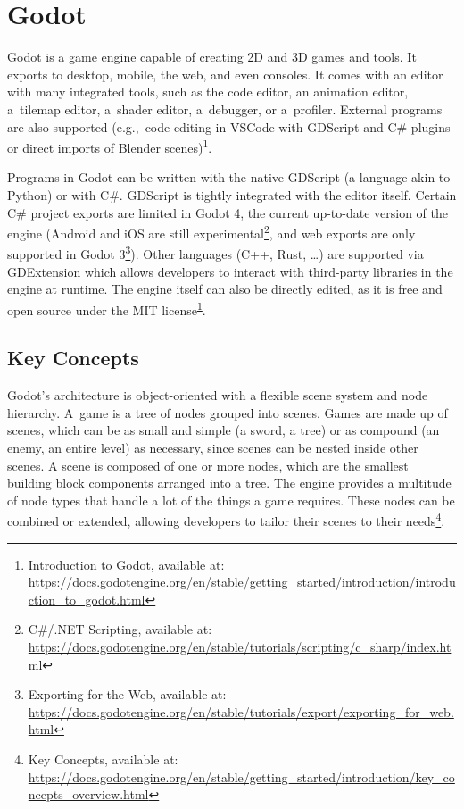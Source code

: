 
\section{Godot}
Godot is a game engine capable of creating 2D and 3D games and tools. It exports to desktop, mobile, the web, and even consoles. It comes with an editor with many integrated tools, such as the code editor, an animation editor, a~tilemap editor, a~shader editor, a~debugger, or a~profiler. External programs are also supported (e.g.,~code editing in VSCode with GDScript and C\# plugins or direct imports of Blender scenes)\footnote{\label{fn:godot-intro}Introduction to Godot, available at: \url{https://docs.godotengine.org/en/stable/getting_started/introduction/introduction_to_godot.html}}.

Programs in Godot can be written with the native GDScript (a language akin to Python) or with C\#. GDScript is tightly integrated with the editor itself.
Certain C\# project exports are limited in Godot 4, the current up-to-date version of the engine (Android and iOS are still experimental\footnote{C\#/{.}NET Scripting, available at: \url{https://docs.godotengine.org/en/stable/tutorials/scripting/c_sharp/index.html}}, and web exports are only supported in Godot 3\footnote{Exporting for the Web, available at: \url{https://docs.godotengine.org/en/stable/tutorials/export/exporting_for_web.html}}). Other languages (C++, Rust, \dots) are supported via GDExtension which allows developers to interact with third-party libraries in the engine at runtime. The engine itself can also be directly edited, as it is free and open source under the MIT license\textsuperscript{\ref{fn:godot-intro}}.


\subsection{Key Concepts}
Godot's architecture is object-oriented with a flexible scene system and node hierarchy. A~game is a tree of nodes grouped into scenes. Games are made up of scenes, which can be as small and simple (a sword, a tree) or as compound (an enemy, an entire level) as necessary, since scenes can be nested inside other scenes.
A scene is composed of one or more nodes, which are the smallest building block components arranged into a tree. The engine provides a multitude of node types that handle a lot of the things a game requires. These nodes can be combined or extended, allowing developers to tailor their scenes to their needs\footnote{\label{fn:godot-concepts}Key Concepts, available at: \url{https://docs.godotengine.org/en/stable/getting_started/introduction/key_concepts_overview.html}}.

